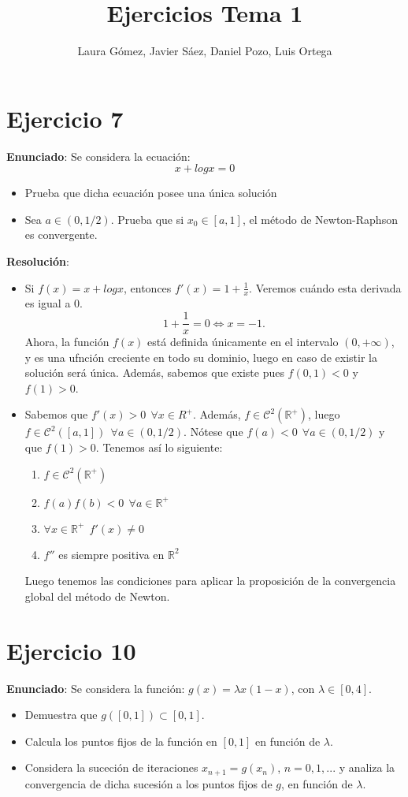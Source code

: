 \documentclass[11pt]{article}
\title{\textbf{Ejercicios Tema 1}}
\author{Laura Gómez, Javier Sáez, Daniel Pozo, Luis Ortega}
\begin{document}
\maketitle
\section{Ejercicio 7}
\textbf{Enunciado}: Se considera la ecuación:
\[
x + logx = 0
\]
\begin{itemize}
	\item Prueba que dicha ecuación posee una única solución
	\item Sea $a \in (0, 1/2)$. Prueba que si $x_0 \in [a,1]$, el método de Newton-Raphson es convergente.
\end{itemize}
\textbf{Resolución}:\\
\begin{itemize}
	\item Si $f(x) = x + logx$, entonces $f'(x) = 1 + \frac{1}{x}$. Veremos cuándo esta derivada es igual a 0.
	\[
	1+\frac{1}{x} = 0 \iff x = -1.
	\]
	Ahora, la función $f(x)$ está definida únicamente en el intervalo $(0,+\infty)$, y es una ufnción creciente en todo su dominio, luego en caso de existir la solución será única. Además, sabemos que existe pues $f(0,1) < 0$ y $f(1) > 0$.
	
	\item Sabemos que $f'(x)>0 \ \ \forall x \in R^+$. Además, $f\in \mathcal{C}^2(\mathbb{R}^+)$, luego $f\in \mathcal{C}^2([a,1]) \ \ \forall a \in (0,1/2)$. Nótese que $f(a) < 0 \ \ \forall a \in (0,1/2)$ y que $f(1) > 0$. Tenemos así lo siguiente:
	\begin{enumerate}
	\item $f \in \mathcal C ^2 (\mathbb R ^+)$
	\item $f(a)f(b) < 0 \ \  \forall a \in \mathbb R ^+$
	\item $\forall x \in \mathbb R ^+ \ \ f'(x) \ne 0$
	\item $f''$ es siempre positiva en $\mathbb R ^2$
\end{enumerate}
Luego tenemos las condiciones para aplicar la proposición de la convergencia global del método de Newton.
\end{itemize}

\section{Ejercicio 10}
\textbf{Enunciado}: Se considera la función: $g(x) = \lambda x(1-x)$, con $\lambda \in [0,4]$.
\begin{itemize}
	\item Demuestra que $g([0,1]) \subset [0,1]$.
	\item Calcula los puntos fijos de la función en $[0,1]$ en función de $\lambda$.
	\item Considera la suceción de iteraciones $x_{n+1} = g(x_n)$, $n=0,1,...$ y analiza la convergencia de dicha sucesión a los puntos fijos de $g$, en función de $\lambda$.
\end{itemize}
\end{document}
